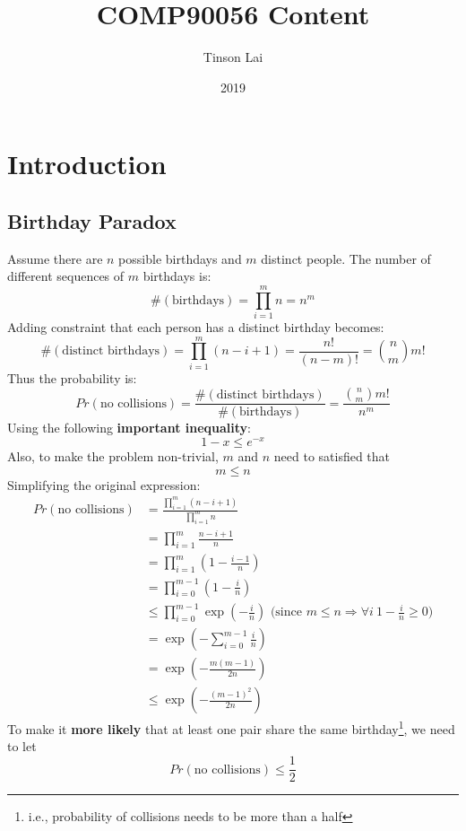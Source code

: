 \documentclass[a4paper]{article}
\title{\textbf{COMP90056 Content}}
\author{Tinson Lai}
\date{2019}
\begin{document}
\maketitle

\tableofcontents

\newpage

\section{Introduction}

\subsection{Birthday Paradox}

Assume there are $n$ possible birthdays and $m$ distinct people. The number of different sequences of $m$ birthdays is:
$$\#(\text{birthdays}) = \prod_{i=1}^{m}n = n^m$$
Adding constraint that each person has a distinct birthday becomes:
$$\#(\text{distinct birthdays}) = \prod_{i=1}^{m}(n-i+1) = \frac{n!}{(n-m)!} = \binom{n}{m}m!$$
Thus the probability is:
$$Pr(\text{no collisions}) = \frac{\#(\text{distinct birthdays})}{\#(\text{birthdays})} = \frac{\binom{n}{m}m!}{n^m}$$
Using the following \textbf{important inequality}:
$$1 - x \leq e^{-x}$$
Also, to make the problem non-trivial, $m$ and $n$ need to satisfied that
$$m \leq n$$
Simplifying the original expression:
\begin{equation*}
\begin{split}
Pr(\text{no collisions}) & = \frac{\prod_{i=1}^{m}(n-i+1)}{\prod_{i=1}^{m}n} \\
& = \prod_{i=1}^{m}\frac{n-i+1}{n} \\
& = \prod_{i=1}^{m}(1-\frac{i-1}{n}) \\
& = \prod_{i=0}^{m-1}(1-\frac{i}{n}) \\
& \leq \prod_{i=0}^{m-1}\exp(-\frac{i}{n}) \text{ (since $m \leq n \Rightarrow \forall i\ 1-\frac{i}{n} \geq 0$)} \\
& = \exp(-\sum_{i=0}^{m-1}\frac{i}{n}) \\
& = \exp(-\frac{m(m-1)}{2n}) \\
& \leq \exp(-\frac{(m-1)^2}{2n})
\end{split}
\end{equation*}
To make it \textbf{more likely} that at least one pair share the same birthday\footnote{i.e., probability of collisions needs to be more than a half}, we need to let
$$Pr(\text{no collisions}) \leq \frac{1}{2}$$
\end{document}
